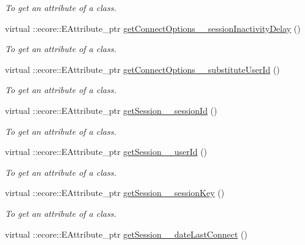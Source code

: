 \begin{DoxyCompactItemize}
\begin{DoxyCompactList}\small\item\em To get an attribute of a class. \item\end{DoxyCompactList}\item 
virtual ::ecore::EAttribute\_\-ptr \hyperlink{classUMS__Data_1_1UMS__DataPackage_ae59f7c821fc6372a4ca3b42d40afa4b2}{getConnectOptions\_\-\_\-sessionInactivityDelay} ()
\begin{DoxyCompactList}\small\item\em To get an attribute of a class. \item\end{DoxyCompactList}\item 
virtual ::ecore::EAttribute\_\-ptr \hyperlink{classUMS__Data_1_1UMS__DataPackage_a1c1917b26bd4cbf84c37fed0e662e214}{getConnectOptions\_\-\_\-substituteUserId} ()
\begin{DoxyCompactList}\small\item\em To get an attribute of a class. \item\end{DoxyCompactList}\item 
virtual ::ecore::EAttribute\_\-ptr \hyperlink{classUMS__Data_1_1UMS__DataPackage_a2ab964110dcebed4e3e5c1cbcfe58134}{getSession\_\-\_\-sessionId} ()
\begin{DoxyCompactList}\small\item\em To get an attribute of a class. \item\end{DoxyCompactList}\item 
virtual ::ecore::EAttribute\_\-ptr \hyperlink{classUMS__Data_1_1UMS__DataPackage_a0d6ec6ddf7ab0218c09fa0ace3495c2e}{getSession\_\-\_\-userId} ()
\begin{DoxyCompactList}\small\item\em To get an attribute of a class. \item\end{DoxyCompactList}\item 
virtual ::ecore::EAttribute\_\-ptr \hyperlink{classUMS__Data_1_1UMS__DataPackage_a7df264bbc105036fd255d084ce904224}{getSession\_\-\_\-sessionKey} ()
\begin{DoxyCompactList}\small\item\em To get an attribute of a class. \item\end{DoxyCompactList}\item 
virtual ::ecore::EAttribute\_\-ptr \hyperlink{classUMS__Data_1_1UMS__DataPackage_a9640793589a390ea50807ffe87a1a455}{getSession\_\-\_\-dateLastConnect} ()

\end{DoxyCompactItemize}
